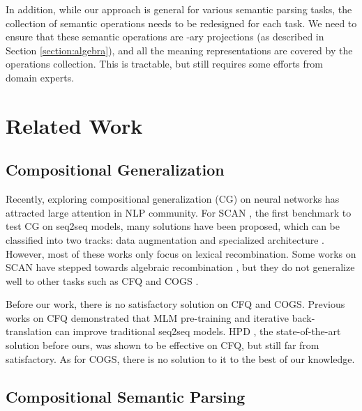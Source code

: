 \documentclass[11pt,a4paper]{article}
\begin{document}
In addition, while our approach is general for various semantic parsing tasks, the collection of semantic operations needs to be redesigned for each task. We  need to ensure that these semantic operations are -ary projections (as described in Section \ref{section:algebra}), and all the meaning representations are covered by the operations collection.
This is tractable, but still requires some efforts from domain experts.






\section{Related Work}







\subsection{Compositional Generalization}

Recently, exploring compositional generalization (CG) on neural networks has attracted large attention in NLP community.
For SCAN \cite{lake2018scan}, the first benchmark to test CG on seq2seq models, many solutions have been proposed, which can be classified into two tracks:
data augmentation \cite{andreas2019dataaug, aky2020dataaug, guo2020dataaugl} 
and specialized architecture \cite{nips2019dataaug, li2019compositional, Gordon2020spstru}.
However, most of these works only focus on lexical recombination.
Some works on SCAN have stepped towards algebraic recombination \cite{liu2020spstru, chen2020spstru}, but they do not generalize well to other tasks such as CFQ \cite{keysers2019measuring} and COGS \cite{kim2020cogs}.

Before our work, there is no satisfactory solution on CFQ and COGS.
Previous works on CFQ demonstrated that MLM pre-training \cite{furrer2020compositional} and iterative back-translation \cite{guo2020revisiting} can improve traditional seq2seq models.
HPD \cite{guo2020hierarchical}, the state-of-the-art solution before ours, was shown to be effective on CFQ, but still far from satisfactory.
As for COGS, there is no solution to it to the best of our knowledge.



\subsection{Compositional Semantic Parsing}
\end{document}
